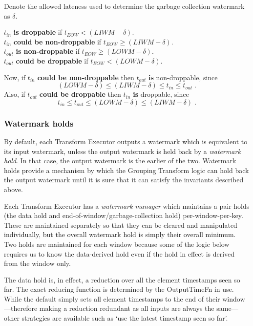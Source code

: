Denote the allowed lateness used to determine the garbage collection watermark as $\delta$.

$t_{\mathit{in}}$ \textbf{is droppable} if $t_{\mathit{EOW}} < (\mathit{LIWM} - \delta)$.\\
$t_{\mathit{in}}$ \textbf{could be non-droppable} if $t_{\mathit{EOW}} \geq (\mathit{LIWM} - \delta)$.\\
$t_{\mathit{out}}$ \textbf{is non-droppable} if $t_{\mathit{EOW}} \geq (\mathit{LOWM} - \delta)$.\\
$t_{\mathit{out}}$ \textbf{could be droppable} if $t_{\mathit{EOW}} < (\mathit{LOWM} - \delta)$.

Now, if $t_{\mathit{in}}$ \textbf{could be non-droppable} then $t_{\mathit{out}}$ \textbf{is} non-droppable, since \[(\mathit{LOWM} - \delta) \leq (\mathit{LIWM} - \delta) \leq t_{\mathit{in}} \leq t_{\mathit{out}}\;\text{.}\]
Also, if $t_{\mathit{out}}$ \textbf{could be droppable} then $t_{\mathit{in}}$ \textbf{is} droppable, since \[t_{\mathit{in}} \leq t_{\mathit{out}} \leq (\mathit{LOWM} - \delta) \leq (\mathit{LIWM} - \delta)\;\text{.}\]


\subsubsection{Watermark holds}

By default, each Transform Executor outputs a watermark which is equivalent to its input watermark, unless the output watermark is held back by a \emph{watermark hold}.
In that case, the output watermark is the earlier of the two.
Watermark holds provide a mechanism by which the Grouping Transform logic can hold back the output watermark until it is sure that it can satisfy the invariants described above.

Each Transform Executor has a \emph{watermark manager} which maintains a pair holds (the data hold and end-of-window/garbage-collection hold) per-window-per-key.
These are maintained separately so that they can be cleared and manipulated individually, but the overall watermark hold is simply their overall minimum.
Two holds are maintained for each window because some of the logic below requires us to know the data-derived hold even if the hold in effect is derived from the window only.

The data hold is, in effect, a reduction over all the element timestamps seen so far.
The exact reducing function is determined by the OutputTimeFn in use.
While the default simply sets all element timestamps to the end of their window---therefore making a reduction redundant as all inputs are always the same---other strategies are available such as `use the latest timestamp seen so far'.

